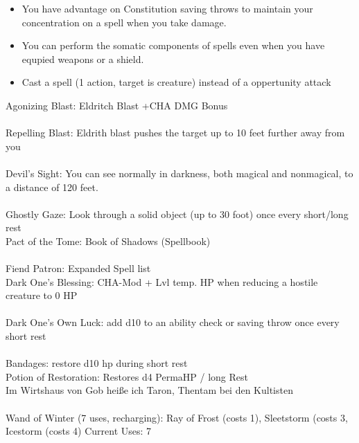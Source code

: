 \documentclass[10pt,a4paper]{scrbook}
\begin{document}
{{\begin{itemize}
				\item You have advantage on Constitution saving throws to maintain your concentration on a spell when you take damage.
				\item  You can perform the somatic components of spells even when you have equpied weapons or a shield.
				\item Cast a spell (1 action, target is creature) instead of a oppertunity attack
			\end{itemize}
			Agonizing Blast: Eldritch Blast +CHA DMG Bonus \\%
			\\%
			Repelling Blast: Eldrith blast pushes the target up to 10 feet further away from you \\
			\\
			Devil’s Sight: You can see normally in darkness, both magical and nonmagical, to a distance of 120 feet. \\
			\\
			Ghostly Gaze: Look through a solid object (up to 30 foot) once every short/long rest
			\\
			Pact of the Tome: Book of Shadows (Spellbook) \\
			\\
			Fiend Patron: Expanded Spell list \\
			Dark One's Blessing: CHA-Mod + Lvl temp. HP when reducing a hostile creature to 0 HP \\
			\\
			Dark One's Own Luck: add d10 to an ability check or saving throw once every short rest \\
			\\
			Bandages: restore d10 hp during short rest \\
			Potion of Restoration: Restores d4 PermaHP / long Rest
			\\
			Im Wirtshaus von Gob heiße ich Taron, Thentam bei den Kultisten \\
			\\
			Wand of Winter (7 uses, recharging): Ray of Frost (costs 1), Sleetstorm (costs 3, Icestorm (costs 4) Current Uses: 7
		}
	}

\end{document}
